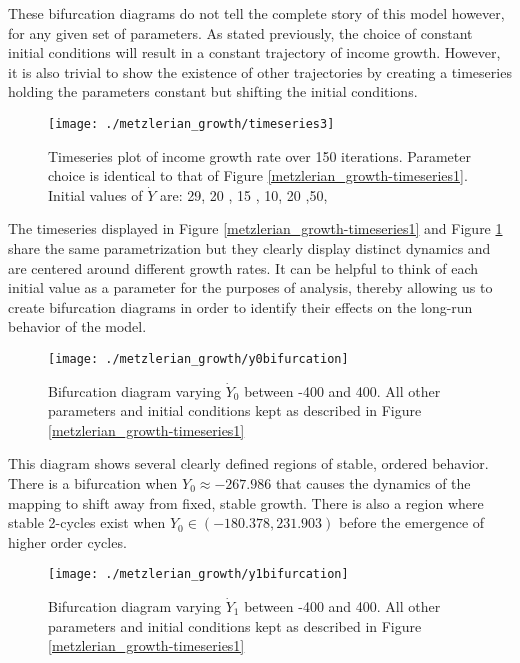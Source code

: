 These bifurcation diagrams do not tell the complete story of this model however, for any given set of parameters. As stated previously, the choice of constant initial conditions will result in a constant trajectory of income growth. However, it is also trivial to show the existence of other trajectories by creating a timeseries holding the parameters constant but shifting the initial conditions.
\begin{figure}
    \centering
    \texttt{[image: ./metzlerian\_growth/timeseries3]}
    \caption{Timeseries plot of income growth rate over 150 iterations. Parameter choice is identical to that of Figure \ref{metzlerian_growth-timeseries1}. Initial values of $\dot Y$ are: 29, 20 , 15 , 10, 20 ,50,}
    \label{metzlerian_growth_timeseries3}
\end{figure}

The timeseries displayed in Figure \ref{metzlerian_growth-timeseries1} and Figure \ref{metzlerian_growth_timeseries3} share the same parametrization but they clearly display distinct dynamics and are centered around different growth rates. It can be helpful to think of each initial value as a parameter for the purposes of analysis, thereby allowing us to create bifurcation diagrams in order to identify their effects on the long-run behavior of the model.

\begin{figure}
    \centering
    \texttt{[image: ./metzlerian\_growth/y0bifurcation]}
    \caption{Bifurcation diagram varying $\dot Y_0$ between -400 and 400. All other parameters and initial conditions kept as described in Figure \ref{metzlerian_growth-timeseries1}}
    \label{metzlerian_growth-y0bifurcation}
\end{figure}

This diagram shows several clearly defined regions of stable, ordered behavior. There is a bifurcation when $Y_0\approx -267.986$ that causes the dynamics of the mapping to shift away from fixed, stable growth. There is also a region where stable 2-cycles exist when $Y_0\in(-180.378, 231.903)$ before the emergence of higher order cycles. 

\begin{figure}
    \centering
    \texttt{[image: ./metzlerian\_growth/y1bifurcation]}
    \caption{Bifurcation diagram varying $\dot Y_1$ between -400 and 400. All other parameters and initial conditions kept as described in Figure \ref{metzlerian_growth-timeseries1}}
    \label{metzlerian_growth-y1bifurcation}
\end{figure}

